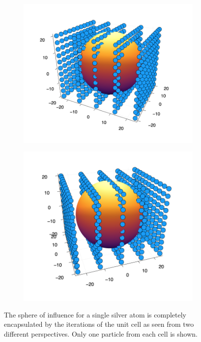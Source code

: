 \begin{figure}
  \centering
  \begin{subfigure}{0.53\textwidth}
    \includegraphics[width=\linewidth]{Figures/iteratedUnitCell}
    \label{iteratedUnitCellFirst}
  \end{subfigure}%
  \hspace*{\fill}   %
  \begin{subfigure}{0.5\textwidth}
    \includegraphics[width=\linewidth]{Figures/iteratedUnitCell2}
    \label{iteratedUnitCellSecond}
  \end{subfigure}
\caption{The sphere of influence for a single silver atom is completely encapsulated by the iterations of the unit cell as seen from two different perspectives. Only one particle from each cell is shown.} \label{iteratedUnitCells}
\end{figure}

